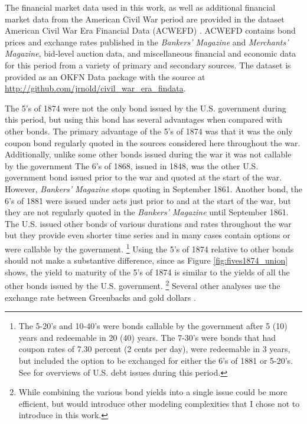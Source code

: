 The financial market data used in this work, as well as additional financial market data from the American Civil War period are provided in the dataset American Civil War Era Financial Data (ACWEFD) \parencite{Arnold2015a}.
ACWEFD contains bond prices and exchange rates published in the \textit{Bankers' Magazine} and \textit{Merchants' Magazine}, bid-level auction data, and miscellaneous financial and economic data for this period from a variety of primary and secondary sources.
The dataset is provided as an OKFN Data package with the source at \url{http://github.com/jrnold/civil_war_era_findata}.

The 5's of 1874 were not the only bond issued by the U.S. government during this period, but using this bond has several advantages when compared with other bonds.
The primary advantage of the 5's of 1874 was that it was the only coupon bond regularly quoted in the sources considered here throughout the war.
Additionally, unlike some other bonds issued during the war it was not callable by the government
The 6's of 1868, issued in 1848, was the other U.S. government bond issued prior to the war and quoted at the start of the war.
However, \textit{Bankers' Magazine} stops quoting in September 1861.
Another bond, the  6's of 1881 were issued under acts just prior to and at the start of the war, but they are not regularly quoted in the \textit{Bankers' Magazine} until September 1861.
The U.S. issued other bonds of various durations and rates throughout the war but they provide even shorter time series and in many cases contain options or were callable by the government.
\footnote{
The 5-20's and 10-40's were bonds callable by the government after 5 (10) years and redeemable in 20 (40) years.
The 7-30's were bonds that had coupon rates of 7.30 percent (2 cents per day), were redeemable in 3 years, but included the option to be exchanged for either the 6's of 1881 or 5-20's.
See \textcites{Bayley1882}{DeKnight1900}[297--309]{HomerSylla2005} for overviews of U.S. debt issues during this period.
}
Using the 5's of 1874 relative to other bonds should not make a substantive difference, since as Figure \ref{fig:fives1874_union} shows, the yield to maturity of the 5's of 1874 is similar to the yields of all the other bonds issued by the U.S. government.
\footnote{
  While combining the various bond yields into a single issue could be more efficient, but would introduce other modeling complexities that I chose not to introduce in this work.
}
Several other analyses use the exchange rate between Greenbacks and gold dollars \parencites{McCandless1996}{WillardGuinnaneEtAl1996}{SmithSmith1997}.
